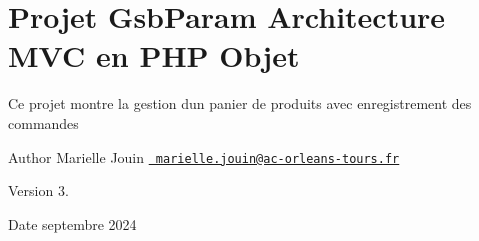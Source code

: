 \chapter{Projet Gsb\+Param Architecture MVC en PHP Objet}
\hypertarget{index}{}\label{index}
Ce projet montre la gestion d\textquotesingle{}un panier de produits avec enregistrement des commandes

\begin{DoxyAuthor}{Author}
Marielle Jouin \href{mailto:marielle.jouin@ac-orleans-tours.fr}{\texttt{ marielle.\+jouin@ac-\/orleans-\/tours.\+fr}} 
\end{DoxyAuthor}
\begin{DoxyVersion}{Version}
3. 
\end{DoxyVersion}
\begin{DoxyDate}{Date}
septembre 2024 
\end{DoxyDate}
